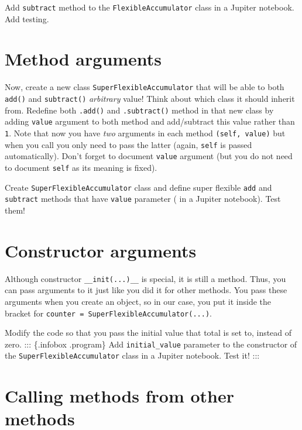 \documentclass[
]{book}
\begin{document}
Add \texttt{subtract} method to the \texttt{FlexibleAccumulator} class in a Jupiter notebook. Add testing.

\hypertarget{method-arguments}{%
\section{Method arguments}\label{method-arguments}}

Now, create a new class \texttt{SuperFlexibleAccumulator} that will be able to both \texttt{add()} and \texttt{subtract()} \emph{arbitrary} value! Think about which class it should inherit from. Redefine both \texttt{.add()} and \texttt{.subtract()} method in that new class by adding \texttt{value} argument to both method and add/subtract this value rather than \texttt{1}. Note that now you have \emph{two} arguments in each method \texttt{(self,\ value)} but when you call you only need to pass the latter (again, \texttt{self} is passed automatically). Don't forget to document \texttt{value} argument (but you do not need to document \texttt{self} as its meaning is fixed).

Create \texttt{SuperFlexibleAccumulator} class and define super flexible \texttt{add} and \texttt{subtract} methods that have \texttt{value} parameter ( in a Jupiter notebook). Test them!

\hypertarget{constructor-arguments}{%
\section{Constructor arguments}\label{constructor-arguments}}

Although constructor \texttt{\_\_init(...)\_\_} is special, it is still a method. Thus, you can pass arguments to it just like you did it for other methods. You pass these arguments when you create an object, so in our case, you put it inside the bracket for \texttt{counter\ =\ SuperFlexibleAccumulator(...)}.

Modify the code so that you pass the initial value that total is set to, instead of zero.
::: \{.infobox .program\}
Add \texttt{initial\_value} parameter to the constructor of the \texttt{SuperFlexibleAccumulator} class in a Jupiter notebook. Test it!
:::

\hypertarget{calling-methods-from-other-methods}{%
\section{Calling methods from other methods}\label{calling-methods-from-other-methods}}
\end{document}
